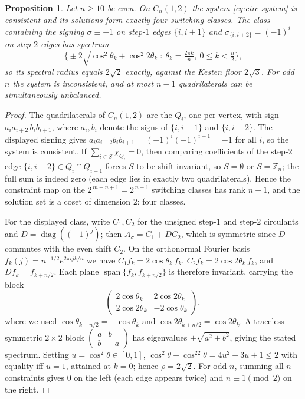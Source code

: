 \documentclass[11pt]{article}
\newtheorem{proposition}[lemma]{Proposition}
\theoremstyle{remark}
\newcommand{\rhomax}{\rho}
\begin{document}
\begin{proposition}\label{prop:circ}
Let $n\ge10$ be even. On $C_n(1,2)$ the system \eqref{eq:circ-system}
is consistent and its solutions form exactly four switching classes. The
class containing the signing $\sigma\equiv+1$ on step-$1$ edges
$\{i,i{+}1\}$ and $\sigma_{\{i,i+2\}}=(-1)^i$ on step-$2$ edges has
spectrum
\[
\Big\{\pm2\sqrt{\cos^2\theta_k+\cos^2 2\theta_k}\ :\
\theta_k=\tfrac{2\pi k}{n},\ 0\le k<\tfrac n2\Big\},
\]
so its spectral radius equals $2\sqrt2$ exactly, against the Kesten floor
$2\sqrt3$. For odd $n$ the system is inconsistent, and at most $n-1$
quadrilaterals can be simultaneously unbalanced.
\end{proposition}

\begin{proof}
The quadrilaterals of $C_n(1,2)$ are the $Q_i$, one per
vertex, with sign $a_ia_{i+2}\,b_ib_{i+1}$, where $a_i,b_i$ denote the
signs of $\{i,i{+}1\}$ and $\{i,i{+}2\}$. The displayed signing gives
$a_ia_{i+2}b_ib_{i+1}=(-1)^i(-1)^{i+1}=-1$ for all $i$, so the system is
consistent. If $\sum_{i\in S}\chi_{Q_i}=0$, then comparing coefficients
of the step-$2$ edge $\{i,i{+}2\}\in Q_i\cap Q_{i-1}$ forces $S$ to be
shift-invariant, so $S=\emptyset$ or $S=\mathbb{Z}_n$; the full sum is
indeed zero (each edge lies in exactly two quadrilaterals). Hence the
constraint map on the $2^{\,m-n+1}=2^{\,n+1}$ switching classes has rank
$n-1$, and the solution set is a coset of dimension $2$: four classes.

For the displayed class, write $C_1,C_2$ for the unsigned step-$1$ and
step-$2$ circulants and $D=\operatorname{diag}((-1)^j)$; then
$A_\sigma=C_1+DC_2$, which is symmetric since $D$ commutes with the even
shift $C_2$. On the orthonormal Fourier basis
$f_k(j)=n^{-1/2}e^{2\pi ijk/n}$ we have $C_1f_k=2\cos\theta_k\,f_k$,
$C_2f_k=2\cos2\theta_k\,f_k$, and $Df_k=f_{k+n/2}$. Each plane
$\operatorname{span}\{f_k,f_{k+n/2}\}$ is therefore invariant, carrying
the block
\[
\begin{pmatrix} 2\cos\theta_k & 2\cos2\theta_k\\
2\cos2\theta_k & -2\cos\theta_k\end{pmatrix},
\]
where we used $\cos\theta_{k+n/2}=-\cos\theta_k$ and
$\cos2\theta_{k+n/2}=\cos2\theta_k$. A traceless symmetric $2\times2$
block $\left(\begin{smallmatrix}a&b\\ b&-a\end{smallmatrix}\right)$ has
eigenvalues $\pm\sqrt{a^2+b^2}$, giving the stated spectrum. Setting
$u=\cos^2\theta\in[0,1]$,
$\cos^2\theta+\cos^22\theta=4u^2-3u+1\le2$ with equality iff $u=1$,
attained at $k=0$; hence $\rhomax=2\sqrt2$. For odd $n$, summing all $n$
constraints gives $0$ on the left (each edge appears twice) and
$n\equiv1\pmod2$ on the right.
\end{proof}
\end{document}
